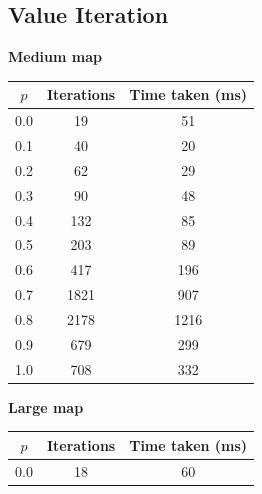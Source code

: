 \documentclass[11pt]{article}
\def \hfillx {\hspace*{-\textwidth} \hfill}
\begin{document}
\subsection{Value Iteration}

\begin{table}[h!]
    \begin{minipage}{0.5\textwidth}
        \centering
        \textbf{Medium map}\\
        \begin{tabular}{@{}c|cc@{}}
        \toprule
        \textbf{$p$} & \textbf{Iterations} & \textbf{Time taken (ms)} \\ \midrule
        0.0          & 19                            & 51                       \\
        0.1          & 40                            & 20                       \\
        0.2          & 62                            & 29                       \\
        0.3          & 90                            & 48                       \\
        0.4          & 132                           & 85                       \\
        0.5          & 203                           & 89                       \\
        0.6          & 417                           & 196                      \\
        0.7          & 1821                          & 907                      \\
        0.8          & 2178                          & 1216                     \\
        0.9          & 679                           & 299                      \\
        1.0          & 708                           & 332                      \\ \bottomrule
        \end{tabular}
    \end{minipage}
    \hfillx
    \begin{minipage}{0.5\textwidth}
        \centering
        \textbf{Large map}\\
        \begin{tabular}{@{}c|cc@{}}
        \toprule
        \textbf{$p$} & \textbf{Iterations} & \textbf{Time taken (ms)} \\ \midrule
        0.0          & 18                  & 60                       \\

\end{tabular}
\end{minipage}
\end{table}
\end{document}
